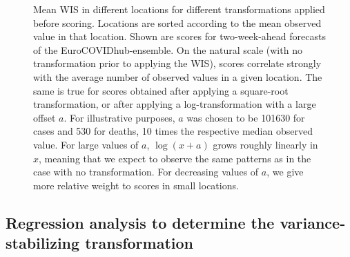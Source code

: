\documentclass[10pt,letterpaper]{article}
\begin{document}
\begin{figure}[h!]
    \centering
    \caption{Mean WIS in different locations for different transformations applied before scoring. Locations are sorted according to the mean observed value in that location. Shown are scores for two-week-ahead forecasts of the EuroCOVIDhub-ensemble. On the natural scale (with no transformation prior to applying the WIS), scores correlate strongly with the average number of observed values in a given location. The same is true for scores obtained after applying a square-root transformation, or after applying a log-transformation with a large offset $a$. For illustrative purposes, $a$ was chosen to be 101630 for cases and 530 for deaths, 10 times the respective median observed value. For large values of $a$, $\log(x + a)$ grows roughly linearly in $x$, meaning that we expect to observe the same patterns as in the case with no transformation. For decreasing values of $a$, we give more relative weight to scores in small locations.}
    \label{fig:HUB-log-different-offsets}
\end{figure}


\subsection*{Regression analysis to determine the variance-stabilizing transformation}
\label{sec:HUB-regression}
\end{document}
